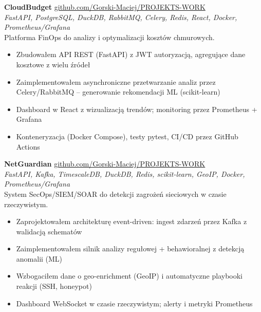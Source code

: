 \documentclass[a4paper,10pt]{article}
\newcommand{\projecttitle}[1]{\textbf{\large #1}}
\begin{document}
\small
\projecttitle{CloudBudget} \hfill \href{https://github.com/Gorski-Maciej/PROJEKTS-WORK/tree/main/cloudbudget}{\textcolor{goldDark}{github.com/Gorski-Maciej/PROJEKTS-WORK}} \\
\textit{FastAPI, PostgreSQL, DuckDB, RabbitMQ, Celery, Redis, React, Docker, Prometheus/Grafana} \\
Platforma FinOps do analizy i optymalizacji kosztów chmurowych.
\begin{itemize}
  \item Zbudowałem API REST (FastAPI) z JWT autoryzacją, agregujące dane kosztowe z wielu źródeł
  \item Zaimplementowałem asynchroniczne przetwarzanie analiz przez Celery/RabbitMQ -- generowanie rekomendacji ML (scikit-learn)
  \item Dashboard w React z wizualizacją trendów; monitoring przez Prometheus + Grafana
  \item Konteneryzacja (Docker Compose), testy pytest, CI/CD przez GitHub Actions
\end{itemize}

\vspace{0.25em}
\projecttitle{NetGuardian} \hfill \href{https://github.com/Gorski-Maciej/PROJEKTS-WORK/tree/main/netguardian}{\textcolor{goldDark}{github.com/Gorski-Maciej/PROJEKTS-WORK}} \\
\textit{FastAPI, Kafka, TimescaleDB, DuckDB, Redis, scikit-learn, GeoIP, Docker, Prometheus/Grafana} \\
System SecOps/SIEM/SOAR do detekcji zagrożeń sieciowych w czasie rzeczywistym.
\begin{itemize}
  \item Zaprojektowałem architekturę event-driven: ingest zdarzeń przez Kafka z walidacją schematów
  \item Zaimplementowałem silnik analizy regułowej + behawioralnej z detekcją anomalii (ML)
  \item Wzbogaciłem dane o geo-enrichment (GeoIP) i automatyczne playbooki reakcji (SSH, honeypot)
  \item Dashboard WebSocket w czasie rzeczywistym; alerty i metryki Prometheus
\end{itemize}
\end{document}
